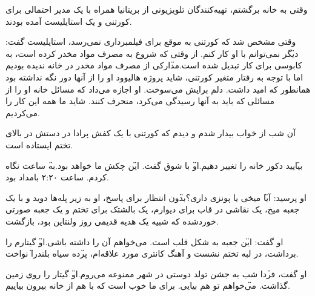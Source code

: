 وقتی به خانه برگشتم، تهیه‌کنندگان تلویزیونی از بریتانیا همراه با یک مدیر احتمالی برای کورتنی و یک استایلیست آمده بودند.

وقتی مشخص شد که کورتنی به موقع برای فیلمبرداری نمی‌رسد، استایلیست گفت: \"دیگر نمی‌توانم با او کار کنم. از وقتی که شروع به مصرف مواد مخدر کرده‌ است، به کابوسی برای کار تبدیل شده است.\"

مدارکی از مصرف مواد مخدر در خانه ندیده بودیم اما با توجه به رفتار متغیر کورتنی، شاید پروژه هالیوود او را از آنها دور نگه نداشته بود همانطور که امید داشت. دلم برایش می‌سوخت. او اجازه می‌داد که مسائل خانه او را از مسائلی که باید به آنها رسیدگی می‌کرد، منحرف کنند. شاید ما همه این کار را می‌کردیم.

آن شب از خواب بیدار شدم و دیدم که کورتنی با یک کفش پرادا در دستش در بالای تختم ایستاده است.

\"بیایید دکور خانه را تغییر دهیم.\" او با شوق گفت. \"این چکش ما خواهد بود.\"

به ساعت نگاه کردم. ساعت ۲:۲۰ بامداد بود.

او پرسید: \"آیا میخی یا پونزی داری؟\" بدون انتظار برای پاسخ، او به زیر پله‌ها دوید و با یک جعبه میخ، یک نقاشی در قاب برای دیوارم، یک بالشتک برای تختم و یک جعبه صورتی خورد‌شده که شبیه یک هدیه قدیمی روز ولنتاین بود، بازگشت.

او گفت: \"این جعبه به شکل قلب است. می‌خواهم آن را داشته باشی.\"

او گیتارم را برداشت، در لبه تختم نشست و آهنگ کانتری مورد علاقه‌ام، \"پرده سیاه بلند\" را نواخت.

او گفت، \"فردا شب به جشن تولد دوستی در شهر ممنوعه می‌روم.\" او گیتار را روی زمین گذاشت. \"می‌خواهم تو هم بیایی. برای ما خوب است که با هم از خانه بیرون بیاییم.\"